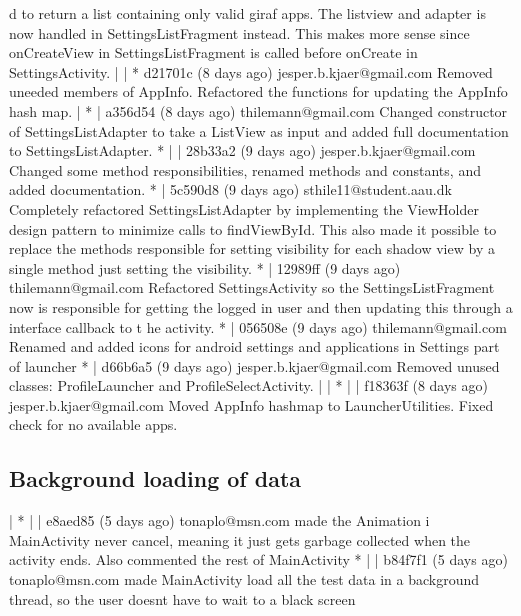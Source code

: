 d to return a list containing only valid giraf apps. The listview and adapter is now handled in SettingsListFragment instead. This makes more sense since onCreateView in SettingsListFragment is called before
 onCreate in SettingsActivity.
 | | * d21701c (8 days ago) jesper.b.kjaer@gmail.com Removed uneeded members of AppInfo. Refactored the functions for updating the AppInfo hash map.
 | * | a356d54 (8 days ago) thilemann@gmail.com Changed constructor of SettingsListAdapter to take a ListView as input and added full documentation to SettingsListAdapter.
 * | | 28b33a2 (9 days ago) jesper.b.kjaer@gmail.com Changed some method responsibilities, renamed methods and constants, and added documentation.
 * | 5c590d8 (9 days ago) sthile11@student.aau.dk Completely refactored SettingsListAdapter by implementing the ViewHolder design pattern to minimize calls to findViewById. This also made it possible to replace the methods responsible for setting visibility for each shadow view by a single method just setting the visibility.
 * | 12989ff (9 days ago) thilemann@gmail.com Refactored SettingsActivity so the SettingsListFragment now is responsible for getting the logged in user and then updating this through a interface callback to t
 he activity.
 * | 056508e (9 days ago) thilemann@gmail.com Renamed and added icons for android settings and applications in Settings part of launcher
 * | d66b6a5 (9 days ago) jesper.b.kjaer@gmail.com Removed unused classes: ProfileLauncher and ProfileSelectActivity.
 | | * | | f18363f (8 days ago) jesper.b.kjaer@gmail.com Moved AppInfo hashmap to LauncherUtilities. Fixed check for no available apps.

\subsection{Background loading of data}
| * | | e8aed85 (5 days ago) tonaplo@msn.com made the Animation i MainActivity never cancel, meaning it just gets garbage collected when the activity ends. Also commented the rest of MainActivity
* | | b84f7f1 (5 days ago) tonaplo@msn.com made MainActivity load all the test data in a background thread, so the user doesnt have to wait to a black screen

